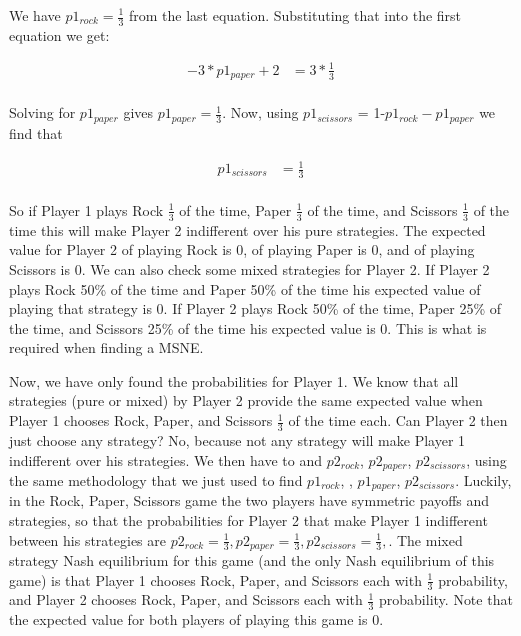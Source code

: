 \documentclass[15pt]{article}
\begin{document}
\begin{enumerate}
We have $p1_{rock}= \frac{1}{3}$
from the last equation. Substituting that into the first equation we get:

\begin{equation} \label{eq7}
\begin{split}
-3*p1_{paper}+2 
& =3*\frac{1}{3}\\
\end{split}
\end{equation}

Solving for $p1_{paper}$ gives $p1_{paper}= \frac{1}{3}$. Now, using $p1_{scissors}$ = 1-$p1_{rock} - p1_{paper}$ we find that 

\begin{equation} \label{eq8}
\begin{split}
p1_{scissors}
& =\frac{1}{3}\\
\end{split}
\end{equation}


So if Player 1 plays Rock $\frac{1}{3}$ of the time, Paper $\frac{1}{3}$ of the time, and Scissors $\frac{1}{3}$ of the time this will make Player 2 indifferent over his pure strategies. The expected value for Player 2 of playing Rock is 0, of playing Paper
is 0, and of playing Scissors is 0. We can also check some mixed strategies for Player 2. If Player 2 plays Rock 50\% of the time and Paper 50\% of the time his expected value of playing that strategy is 0. If Player 2 plays Rock 50\% of the time, Paper 25\% of the time, and Scissors 25\% of the time his expected value is 0. This is what is required when finding a MSNE.

Now, we have only found the probabilities for Player 1. We know that all strategies (pure or mixed) by Player 2 provide the same expected value when Player 1 chooses Rock, Paper, and Scissors $\frac{1}{3}$ of the time each. Can Player 2 then just choose any strategy? No, because not any strategy will make Player 1 indifferent over his strategies. We then have to and $p2_{rock}$, $p2_{paper}$, $p2_{scissors}$, using the same methodology that we just used to find $p1_{rock}$, , $p1_{paper}$, $p2_{scissors}$. Luckily, in the Rock, Paper, Scissors game the two players
have symmetric payoffs and strategies, so that the probabilities for Player 2 that make Player 1 indifferent
between his strategies are $p2_{rock}=\frac{1}{3}, p2_{paper}=\frac{1}{3}, p2_{scissors}=\frac{1}{3},$. The mixed strategy Nash equilibrium for this game (and the only Nash equilibrium of this game) is that Player 1 chooses Rock, Paper, and Scissors each with $\frac{1}{3}$ probability, and Player 2 chooses Rock, Paper, and Scissors each with $\frac{1}{3}$ probability. Note that the expected value for both players of playing this game is 0. 


\end{enumerate}
\end{document}
